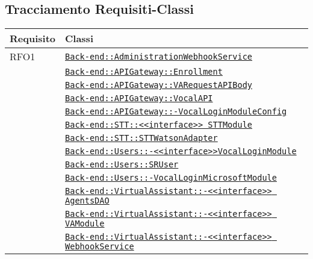 \subsection{Tracciamento Requisiti-Classi}
\normalsize
\begin{longtable}{|>{\centering}m{3cm}|m{10cm}<{\centering}|}
\hline 
\textbf{Requisito} & \textbf{Classi}\\
\hline
\endhead
RFO1 & \hyperref[Back-end::AdministrationWebhookService]{\texttt{Back-end::AdministrationWebhookService}}\\
& \hyperref[Back-end::APIGateway::Enrollment]{\texttt{Back-end::APIGateway::Enrollment}}\\
& \hyperref[Back-end::APIGateway::VARequestAPIBody]{\texttt{Back-end::APIGateway::VARequestAPIBody}}\\
& \hyperref[Back-end::APIGateway::VocalAPI]{\texttt{Back-end::APIGateway::VocalAPI}}\\
& \hyperref[Back-end::APIGateway::VocalLoginModuleConfig]{\texttt{Back-end::APIGateway::-\linebreak VocalLoginModuleConfig}}\\
& \hyperref[Back-end::STT::<<interface>> STTModule]{\texttt{Back-end::STT::<<interface>> STTModule}}\\
& \hyperref[Back-end::STT::STTWatsonAdapter]{\texttt{Back-end::STT::STTWatsonAdapter}}\\
& \hyperref[Back-end::Users::<<interface>>VocalLoginModule]{\texttt{Back-end::Users::-\linebreak <<interface>>VocalLoginModule}}\\
& \hyperref[Back-end::Users::SRUser]{\texttt{Back-end::Users::SRUser}}\\
& \hyperref[Back-end::Users::VocalLoginMicrosoftModule]{\texttt{Back-end::Users::-\linebreak VocalLoginMicrosoftModule}}\\
& \hyperref[Back-end::VirtualAssistant::<<interface>> AgentsDAO]{\texttt{Back-end::VirtualAssistant::-\linebreak <<interface>> AgentsDAO}}\\
& \hyperref[Back-end::VirtualAssistant::<<interface>> VAModule]{\texttt{Back-end::VirtualAssistant::-\linebreak <<interface>> VAModule}}\\
& \hyperref[Back-end::VirtualAssistant::<<interface>> WebhookService]{\texttt{Back-end::VirtualAssistant::-\linebreak <<interface>> WebhookService}}\\

\end{longtable}
